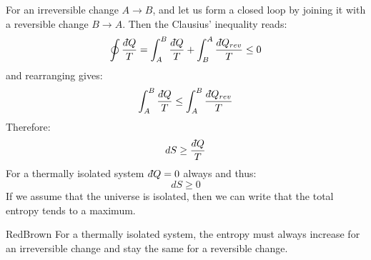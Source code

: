 \documentclass[a4paper,11pt,oneside]{book}
\newcommand{\dbar}{d\hspace*{-0.08em}\bar{}\hspace*{0.1em}}
\begin{document}
For an irreversible change $A \rightarrow B$, and let us form a closed loop by joining it with a reversible change $B \rightarrow A$. Then the Clausius' inequality reads:
\begin{equation}
    \oint \frac{\dbar Q}{T} = \int_A^B \frac{\dbar Q}{T}+\int_B^A \frac{\dbar Q_{rev}}{T}\leq 0
\end{equation}
and rearranging gives:
\begin{equation}
    \int_A^B \frac{\dbar Q}{T} \leq \int_A^B \frac{\dbar Q_{rev}}{T}
\end{equation}
Therefore:
\begin{equation}
    dS \geq \frac{\dbar Q}{T} 
\end{equation}
For a thermally isolated system $\dbar Q = 0$ always and thus:
\begin{equation}
    \boxed{dS \geq 0}
\end{equation}
If we assume that the universe is isolated, then we can write that the total entropy tends to a maximum. 


\begin{mybox}{RedBrown}{\textbf{}}
For a thermally isolated system, the entropy must always increase for an irreversible change and stay the same for a reversible change. 

\end{mybox}
\end{document}
